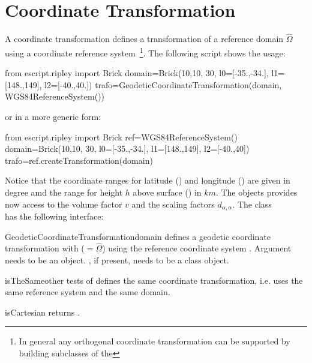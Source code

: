 \section{Coordinate Transformation}\label{sec:ref:trafo}
A coordinate transformation defines a transformation of a reference domain $\widehat{\Omega}$ using
a coordinate reference system~\footnote{In general any orthogonal coordinate transformation can be supported
by building subclasses of the }. The following script shows the usage:
\begin{python}
from escript.ripley import Brick
domain=Brick(10,10, 30, l0=[-35.,-34.], l1=[148.,149], l2=[-40.,40.])
trafo=GeodeticCoordinateTransformation(domain, WGS84ReferenceSystem())
\end{python}
or in a more generic form:
\begin{python}
from escript.ripley import Brick
ref=WGS84ReferenceSystem()
domain=Brick(10,10, 30, l0=[-35.,-34.], l1=[148.,149], l2=[-40.,40])
trafo=ref.createTransformation(domain)
\end{python}
Notice that the coordinate ranges for latitude () and 
longitude () are given in degree amd
the range for height $h$ above surface () in $km$.
The  objects provides now access to the volume factor $v$ and the scaling factors $d_{\alpha, \alpha}$.   
The class \\  has the following interface:
\begin{classdesc}{GeodeticCoordinateTransformation}{domain }
defines a geodetic coordinate transformation with  ($=\widehat{\Omega}$) 
using the reference coordinate system . 
Argument  needs to be an \escript {} object.
, if present, needs to be a  class object.
\end{classdesc}


\begin{methoddesc}[GeodeticCoordinateTransformation]{isTheSame}{other}
tests of  defines the same coordinate transformation, i.e. uses the same reference system and the same domain.
\end{methoddesc}


\begin{methoddesc}[GeodeticCoordinateTransformation]{isCartesian}{}
returns \False.
\end{methoddesc}

